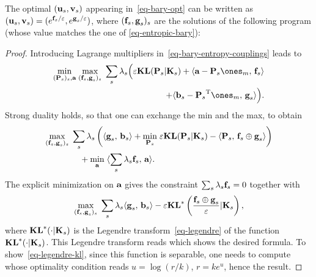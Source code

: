\begin{prop}
	The optimal $(\mathrm{\textbf{u}}_s,\mathrm{\textbf{v}}_s)$ appearing in~\eqref{eq-bary-opt} can be written as $(\mathrm{\textbf{u}}_s,\mathrm{\textbf{v}}_s) = ( e^{\mathrm{\textbf{f}}_s/\varepsilon},e^{\mathrm{\textbf{g}}_s/\varepsilon} )$, where $( \mathrm{\textbf{f}}_s,\mathrm{\textbf{g}}_s )_s$ are the solutions of the following program (whose value matches the one of \eqref{eq-entropic-bary}):
\end{prop}

\begin{proof}	Introducing Lagrange multipliers in~\eqref{eq-bary-entropy-couplings} leads to
	\begin{align*}
		\umin{ (\P_s)_s, \a } 
		\umax{ ( \fD_s,\gD_s )_s }
		\sum_{s} \la_s \Big(
			\epsilon \KLD( \P_s|\K_s )
			+ 
			\dotp{\a - \P_s\ones_m}{ \fD_s } \\
		\qquad\qquad	+			
			\dotp{\b_s - \transp{\P_s}\ones_m}{ \gD_s }
		\Big).
	\end{align*}
	Strong duality holds, so that one can exchange the min and the max, to obtain
		\begin{align*}
		&\underset{ ( \mathrm{\textbf{f}}_s,\mathrm{\textbf{g}}_s )_s }{\max}\;
			\sum_s \lambda_s \left( 
				 \langle \mathrm{\textbf{g}}_s,\,\mathrm{\textbf{b}}_s\rangle
		+ 
		\underset{\mathrm{\textbf{P}}_s}{\min}\; \varepsilon \mathrm{\textbf{KL}}( \mathrm{\textbf{P}}_s|\mathrm{\textbf{K}}_s ) - \langle \mathrm{\textbf{P}}_s,\,\mathrm{\textbf{f}}_s \oplus \mathrm{\textbf{g}}_s \rangle
		 \right) \\
	&\qquad\qquad	+ \underset{\mathrm{\textbf{a}}}{\min}\;
			\langle  \sum_{s} \lambda_s \mathrm{\textbf{f}}_s ,\,\mathrm{\textbf{a}}\rangle.
	\end{align*}
	The explicit minimization on $\mathrm{\textbf{a}}$ gives the constraint $\sum_{s} \lambda_s \mathrm{\textbf{f}}_s=0$ together with 
	\begin{align*}
		\underset{ ( \mathrm{\textbf{f}}_s,\mathrm{\textbf{g}}_s )_s }{\max}\;
			\sum_s \lambda_s 
				 \langle \mathrm{\textbf{g}}_s,\,\mathrm{\textbf{b}}_s\rangle
		-
		\varepsilon \mathrm{\textbf{KL}}^*\left(  \frac{\mathrm{\textbf{f}}_s \oplus \mathrm{\textbf{g}}_s}{\varepsilon}|\mathrm{\textbf{K}}_s  \right),
	\end{align*}
	where $\mathrm{\textbf{KL}}^*(\cdot|\mathrm{\textbf{K}}_s)$ is the Legendre transform~\eqref{eq-legendre} of the function $\mathrm{\textbf{KL}}^*(\cdot|\mathrm{\textbf{K}}_s)$.
	This Legendre transform reads
	which shows the desired formula. 
	To show~\eqref{eq-legendre-kl}, since this function is separable, one needs to compute
	whose optimality condition reads $u=\log(r/k)$, \ie $r = k e^{u}$, hence the result.
\end{proof}

